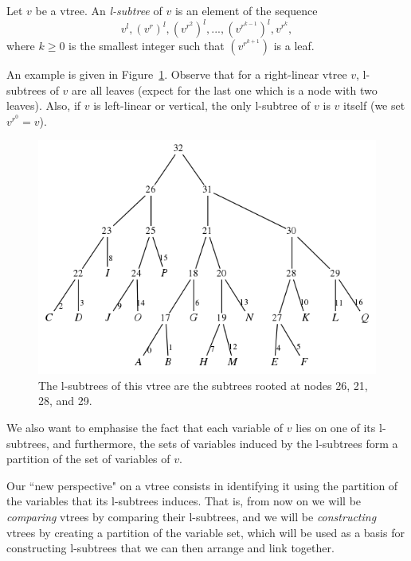 \documentclass[11pt]{article}
\newenvironment{definition}[1][Definition]{\begin{trivlist}
\item[\hskip \labelsep {\bfseries #1}]}{\end{trivlist}}
\begin{document}
\begin{definition} Let $v$ be a vtree. An \textit{l-subtree} of $v$ is an element of the sequence $$v^l, (v^r)^l, (v^{r^2})^l, ..., (v^{r^{k-1}})^l, v^{r^k},$$ where $k \geq 0$ is the smallest integer such that $(v^{r^{k+1}})$ is a leaf.
\end{definition}

An example is given in Figure~\ref{fig:lsubtrees_vtree_example}. Observe that for a right-linear vtree $v$, l-subtrees of $v$ are all leaves (expect for the last one which is a node with two leaves). Also, if $v$ is left-linear or vertical, the only l-subtree of $v$ is $v$ itself (we set $v^{r^0} = v$). 

\begin{figure}
\centering
\includegraphics[scale=0.5]{pseudorightlinearfirstexample.png}
\caption{The l-subtrees of this vtree are the subtrees rooted at nodes 26, 21, 28, and 29.}
\label{fig:lsubtrees_vtree_example}
\end{figure}

We also want to emphasise the fact that each variable of $v$ lies on one of its l-subtrees, and furthermore, the sets of variables induced by the l-subtrees form a partition of the set of variables of $v$.

Our ``new perspective" on a vtree consists in identifying it using the partition of the variables that its l-subtrees induces. That is, from now on we will be \textit{comparing }vtrees by comparing their l-subtrees, and we will be \textit{constructing }vtrees by creating a partition of the variable set, which will be used as a basis for constructing l-subtrees that we can then arrange and link together.
\end{document}
